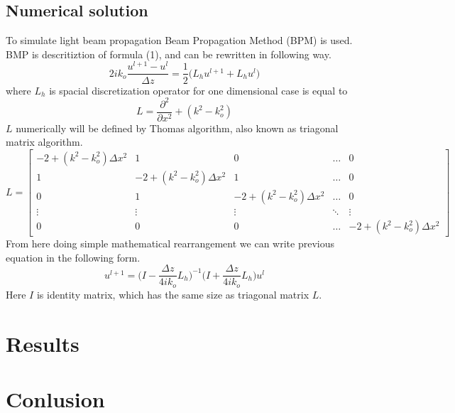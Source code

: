 \documentclass{article}
\begin{document}
	\subsection{Numerical solution}
	To simulate light beam propagation Beam Propagation Method (BPM) is used. BMP is descritiztion of formula (1), and can be rewritten in following way.
	\[2ik_o\frac{u^{l+1}-u^l}{\Delta z}=\frac{1}{2}\bigg(L_hu^{l+1}+L_hu^l\bigg)\]
	where $L_h$ is spacial discretization operator for one dimensional case is equal to
	\[L= \frac{\partial^2 }{\partial x^2}+(k^2-k_o^2)\]
	$L$ numerically will be defined by Thomas algorithm, also known as triagonal matrix algorithm. 
	\[ L = \begin{bmatrix}
    -2+(k^2-k_o^2)\Delta x^2& 1& 0& \dots  & 0 \\
    1 &     -2+(k^2-k_o^2)\Delta x^2 & 1 & \dots  & 0 \\
    0 &     1& -2+(k^2-k_o^2)\Delta x^2 & \dots  & 0 \\
    \vdots & \vdots & \vdots & \ddots & \vdots \\
    0& 0& 0& \dots  &     -2+(k^2-k_o^2)\Delta x^2
\end{bmatrix}\]
From here doing simple mathematical rearrangement we can write previous equation in the following form.
	\[u^{l+1} = \bigg(I-\frac{\Delta z}{4ik_o}L_h\bigg)^{-1}\bigg(I+\frac{\Delta z}{4ik_o}L_h\bigg) u^l\]
Here $I$ is identity matrix, which has the same size as triagonal matrix $L$.
	\section{Results}
	\section{Conlusion}
\end{document}
